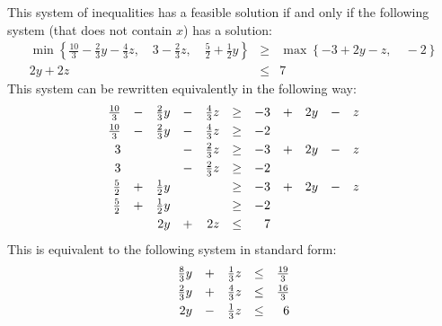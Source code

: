 \documentclass[12pt, showidx, twoside]{article}
\begin{document}
{{{{This system of inequalities has a feasible solution if and only if the following 
system (that does not contain $x$) has a solution:
\begin{equation}\label{eq::FM3}
\begin{array}{rcl}
\min\left\{\frac{10}{3} - \frac{2}{3}y  - \frac{4}{3}z, \quad
      3 - \frac{2}{3}z, \quad
      \frac{5}{2}  + \frac{1}{2}y
    \right\} 
& \geq & 
\max\left\{-3 + 2y - z, \quad
      -2   \right\}\\
2y + 2z & \leq & 7
\end{array}
\end{equation}\label{eq::FM4}
This system can be rewritten equivalently in the following way:
\begin{equation}
\begin{array}{rrrrrrrrrrr}
\frac{10}{3} & - & \frac{2}{3}y  & - & \frac{4}{3}z & \geq & -3 & + & 2y & - & z \vspace*{1mm} \\ 
\frac{10}{3} & - & \frac{2}{3}y  & - & \frac{4}{3}z & \geq & -2 &   &    &   &   \vspace*{1mm}\\
       3     &   &               & - & \frac{2}{3}z & \geq &  -3 & + & 2y & - & z \vspace*{1mm}\\
       3     &   &               & - & \frac{2}{3}z & \geq & -2 &   &    &   &   \vspace*{1mm}\\
\frac{5}{2}  & + & \frac{1}{2}y  &   &              & \geq &  -3 & + & 2y & - & z \vspace*{1mm}\\
\frac{5}{2}  & + & \frac{1}{2}y  &   &              & \geq & -2 &   &    &   &   \vspace*{1mm}\\
&   & 2y & + & 2z & \leq & 7
\end{array}
\end{equation}
This is equivalent to the following system in standard form:
\begin{equation}\label{eq::FM5}
\begin{array}{rrrrr}
\frac{8}{3}y  & + & \frac{1}{3}z & \leq & \frac{19}{3}\vspace*{1mm}\\
\frac{2}{3}y  & + & \frac{4}{3}z & \leq & \frac{16}{3}\vspace*{1mm}\\
2y            & - & \frac{1}{3}z & \leq & 6 \vspace*{1mm}\\

\end{array}
\end{equation}}}}}
\end{document}
